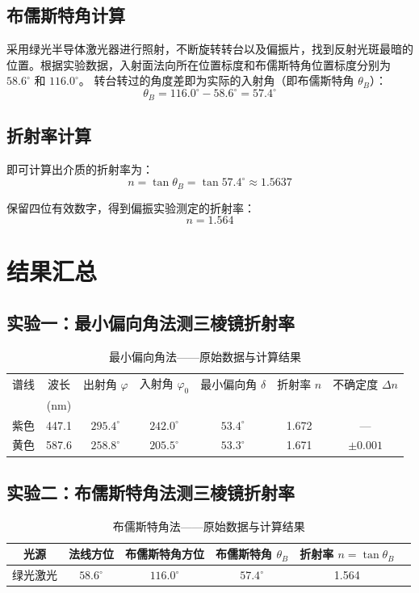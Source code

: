 \documentclass[12pt,a4paper]{ctexart}
\begin{document}
\subsection{布儒斯特角计算}
采用绿光半导体激光器进行照射，不断旋转转台以及偏振片，找到反射光斑最暗的位置。根据实验数据，入射面法向所在位置标度和布儒斯特角位置标度分别为 $58.6^\circ$ 和 $116.0^\circ$。
转台转过的角度差即为实际的入射角（即布儒斯特角 $\theta_B$）：
\[
\theta_B = 116.0^\circ - 58.6^\circ = 57.4^\circ
\]

\subsection{折射率计算}
即可计算出介质的折射率为：
\[
n = \tan \theta_B = \tan 57.4^\circ \approx 1.5637
\]

保留四位有效数字，得到偏振实验测定的折射率：
\[
n = \boxed{1.564}
\]

\section{结果汇总}

\subsection{实验一：最小偏向角法测三棱镜折射率}

\begin{table}[h]
\centering
\caption{最小偏向角法——原始数据与计算结果}
\begin{tabular}{ccccccc}
\toprule
谱线 & 波长 & 出射角 $\varphi$ & 入射角 $\varphi_0$ & 最小偏向角 $\delta$ & 折射率 $n$ & 不确定度 $\Delta n$ \\
     & (nm)  &                  &                    &                     &            &                      \\
\midrule
紫色 & 447.1 & $295.4^\circ$ & $242.0^\circ$ & $53.4^\circ$ & 1.672 & — \\
黄色 & 587.6 & $258.8^\circ$ & $205.5^\circ$ & $53.3^\circ$ & 1.671 & $\pm 0.001$ \\
\bottomrule
\end{tabular}
\end{table}

\subsection{实验二：布儒斯特角法测三棱镜折射率}

\begin{table}[h]
\centering
\caption{布儒斯特角法——原始数据与计算结果}
\begin{tabular}{cccccc}
\toprule
光源 & 法线方位 & 布儒斯特角方位 & 布儒斯特角 $\theta_B$ & 折射率 $n = \tan\theta_B$ \\
\midrule
绿光激光 & $58.6^\circ$ & $116.0^\circ$ & $57.4^\circ$ & 1.564 \\
\bottomrule
\end{tabular}
\end{table}
\end{document}
